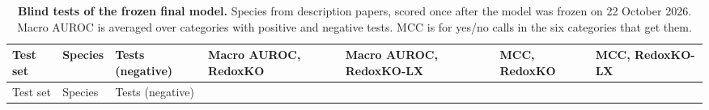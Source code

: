 \documentclass[10pt,a4paper,onecolumn]{article}
\begin{document}
{\begin{longtable}[]{@{}
  >{\raggedright\arraybackslash}p{}
  >{\raggedright\arraybackslash}p{}
  >{\raggedright\arraybackslash}p{}
  >{\raggedleft\arraybackslash}p{}
  >{\raggedleft\arraybackslash}p{}
  >{\raggedleft\arraybackslash}p{}
  >{\raggedleft\arraybackslash}p{}@{}}
\caption{\textbf{Blind tests of the frozen final model.} Species from
description papers, scored once after the model was frozen on 22 October
2026. Macro AUROC is averaged over categories with positive and negative
tests. MCC is for yes/no calls in the six categories that get them.
\label{tab:s_blind}}\tabularnewline
\toprule\noalign{}
\begin{minipage}[b]{\linewidth}\raggedright
Test set
\end{minipage} & \begin{minipage}[b]{\linewidth}\raggedright
Species
\end{minipage} & \begin{minipage}[b]{\linewidth}\raggedright
Tests (negative)
\end{minipage} & \begin{minipage}[b]{\linewidth}\raggedleft
Macro AUROC, RedoxKO
\end{minipage} & \begin{minipage}[b]{\linewidth}\raggedleft
Macro AUROC, RedoxKO-LX
\end{minipage} & \begin{minipage}[b]{\linewidth}\raggedleft
MCC, RedoxKO
\end{minipage} & \begin{minipage}[b]{\linewidth}\raggedleft
MCC, RedoxKO-LX
\end{minipage} \\
\midrule\noalign{}
\endfirsthead
\toprule\noalign{}
\begin{minipage}[b]{\linewidth}\raggedright
Test set
\end{minipage} & \begin{minipage}[b]{\linewidth}\raggedright
Species
\end{minipage} & \begin{minipage}[b]{\linewidth}\raggedright
Tests (negative)
\end{minipage} & \begin{minipage}[b]{\linewidth}\raggedleft

\end{minipage}
\end{longtable}}
\end{document}
